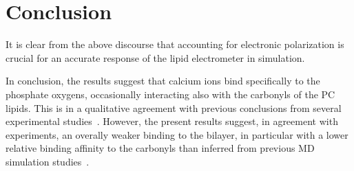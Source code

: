 \chapter*{Conclusion}

It is clear from the above discourse that accounting for electronic polarization is crucial for an accurate response of the lipid electrometer in simulation. 


In conclusion, the results suggest that calcium ions bind specifically to the phosphate oxygens, occasionally interacting also with the carbonyls of the PC lipids. This is in a qualitative agreement with previous conclusions from several experimental studies~\citep{hauser76, hauser78, herbette84, cevc90, binder02}. However, the present results suggest, in 
agreement with experiments, an overally weaker binding to the bilayer, in particular with a lower relative binding affinity to the carbonyls than inferred from previous MD simulation studies~\citep{bockmann03, bockmann04, melcrova16, javanainen17}. 
